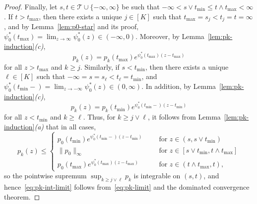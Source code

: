\documentclass[a4paper]{article}
\newcommand{\norm}[1]{\|{#1}\|}
\theoremstyle{definition}
\begin{document}
\begin{proof}
Finally, let $s,t \in \mathcal{T} \cup \{-\infty,\infty\}$ be such that $-\infty < s \vee t_{\min} \leq t \wedge t_{\max} < \infty$. If $t > t_{\max}$, then there exists a unique $j \in [K]$ such that $t_{\max} = s_j < t_j = t = \infty$, and by Lemma~\ref{lem:p0-star} and its proof, $\psi_0^*(t_{\max}) = \lim_{z \to \infty}\psi_0^*(z) \in (-\infty,0)$. Moreover, by Lemma~\ref{lem:pk-induction}\textit{(c)},
\[
p_k(z) = p_k(t_{\max})e^{\psi_0^*(t_{\max})(z - t_{\max})}
\]
for all $z > t_{\max}$ and $k \geq j$. Similarly, if $s < t_{\min}$, then there exists a unique $\ell \in [K]$ such that $-\infty = s = s_\ell < t_\ell = t_{\min}$, and $\psi_0^*(t_{\min}-) = \lim_{z \to -\infty}\psi_0^*(z) \in (0,\infty)$. In addition, by Lemma~\ref{lem:pk-induction}\textit{(c)},
\[
p_k(z) = p_k(t_{\min})e^{\psi_0^*(t_{\min}-)(z - t_{\min})}
\]
for all $z < t_{\min}$ and $k \geq \ell$. Thus, for $k \geq j \vee \ell$, it follows from Lemma~\ref{lem:pk-induction}\textit{(a)} that in all cases,
\[
p_k(z) \leq
\begin{cases}
p_0(t_{\min})e^{\psi_0^*(t_{\min}-)(z - t_{\min})} \;\;&\quad\text{for }z \in (s,s \vee t_{\min}) \\
\norm{p_0}_\infty \;\;&\quad\text{for }z \in [s \vee t_{\min},t \wedge t_{\max}] \\
p_0(t_{\max})e^{\psi_0^*(t_{\max})(z - t_{\max})} \;\;&\quad\text{for }z \in (t \wedge t_{\max},t),
\end{cases}
\]
so the pointwise supremum $\sup_{k \geq j \vee \ell} p_k$ is integrable on $(s,t)$, and hence~\eqref{eq:pk-int-limit} follows from~\eqref{eq:pk-limit} and the dominated convergence theorem.
\end{proof}
\end{document}
